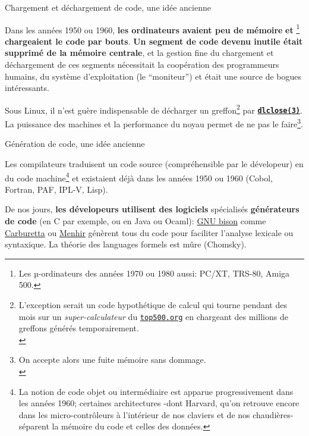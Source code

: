 \documentclass[final,a4,xcolor={svgnames,dvipsnames}]{beamer}
\begin{document}
 \begin{frame}{Chargement et déchargement de code, une idée ancienne}

   Dans les années 1950 ou 1960, \textbf{les ordinateurs avaient peu
     de mémoire} {} \textbf{et} {}\footnote{Les µ-ordinateurs des
   années 1970 ou 1980 aussi: PC/XT, TRS-80, Amiga 500.}
   \textbf{chargeaient le code par bouts}. \textbf{Un segment de code
     devenu inutile était supprimé de la mémoire centrale}, et la
   gestion fine du chargement et déchargement de ces segments
   nécessitait la coopération des programmeurs humains, du système
   d'exploitation (le ``moniteur'') et était une source de bogues
   intéressants.

   \bigskip

   Sous Linux, il n'est guère indispensable de décharger un
   greffon\footnote{L'exception serait un code hypothétique de calcul
   qui tourne pendant des mois sur un \textit{super-calculateur} du
   \href{https://top500.org/}{\texttt{top500.org}} en chargeant des
   millions de greffons générés temporairement.\\} par
   \textbf{\texttt{\href{https://man7.org/linux/man-pages/man3/dlclose.3.html}{dlclose(3)}}}. La
   puissance des machines et la performance du noyau
   {}
   permet de ne pas le faire\footnote{On accepte alors une fuite
   mémoire sans dommage.\\}.

 \end{frame}

 \begin{frame}{Génération de code, une idée ancienne}

  Les compilateurs traduisent un code source (compréhensible par le
  dévelopeur) en du code machine\footnote{La notion de code objet ou
  intermédiaire est apparue progressivement dans les années 1960;
  certaines architectures -dont Harvard, qu'on retrouve encore dans
  les micro-contrôleurs à l'intérieur de nos claviers et de nos
  chaudières- séparent la mémoire du code et celles des données.} et
  existaient déjà dans les années 1950 ou 1960 (Cobol, Fortran, PAF,
  IPL-V, Lisp).

  \bigskip

  De nos jours, \textbf{les dévelopeurs utilisent des logiciels}
  spécialisés \textbf{générateurs de code} (en C par exemple, ou en
  Java ou Ocaml): \href{https://www.gnu.org/software/bison/}{GNU
    bison} comme \href{https://carburetta.com/}{Carburetta} ou
  \href{https://gallium.inria.fr/~fpottier/menhir/}{Menhir} génèrent
  tous du code pour faciliter l'analyse lexicale ou syntaxique. La
  théorie des languages formels est mûre (Chomsky).
 \end{frame}
\end{document}
